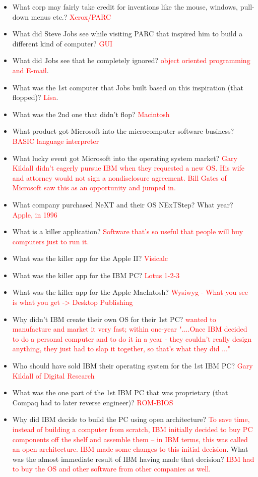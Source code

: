 \documentclass[9pt,landscape]{memoir}
\newcommand{\answer}[1]{\textcolor{red}{#1}}
\begin{document}
\begin{multicols}{6}
\begin{itemize}
    \item What corp may fairly take credit for inventions like the mouse, windows, pull-down menus etc.? \answer{Xerox/PARC}
    \item What did Steve Jobs see while visiting PARC that inspired him to build a different kind of computer? \answer{GUI}
    \item What did Jobs see that he completely ignored? \answer{object oriented programming and E-mail}.
    \item What was the 1st computer that Jobs built based on this inspiration (that flopped)? \answer{Lisa}.
    \item What was the 2nd one that didn't flop? \answer{Macintosh}
    \item What product got Microsoft into the microcomputer software business? \answer{BASIC language interpreter}
    \item What lucky event got Microsoft into the operating system market? \answer{Gary Kildall didn't eagerly pursue IBM when they requested a new OS. His wife and attorney would not sign a nondisclosure agreement. Bill Gates of Microsoft saw this as an opportunity and jumped in.}
    \item What company purchased NeXT and their OS NExTStep? What year? \answer{Apple, in 1996}
    \item What is a killer application? \answer{Software that's so useful that people will buy computers just to run it.}
    \item What was the killer app for the Apple II? \answer{Visicalc}
    \item What was the killer app for the IBM PC? \answer{Lotus 1-2-3}
    \item What was the killer app for the Apple MacIntosh? \answer{Wysiwyg - What you see is what you get -> Desktop Publishing}
    \item Why didn't IBM create their own OS for their 1st PC? \answer{wanted to manufacture and market it very fast; within one-year "....Once IBM decided to do a personal computer and to do it in a year - they couldn't really design anything, they just had to slap it together, so that's what they did ..."}
    \item Who should have sold IBM their operating system for the 1st IBM PC? \answer{Gary Kildall of Digital Research} \item What was the one part of the 1st IBM PC that was proprietary (that Compaq had to later reverse engineer)? \answer{ROM-BIOS}
    \item Why did IBM decide to build the PC using open architecture? \answer{To save time, instead of building a computer from scratch, IBM initially decided to buy PC components off the shelf and assemble them -- in IBM terms, this was called an open architecture. IBM made some changes to this initial decision}. What was the almost immediate result of IBM having made that decision? \answer{IBM had to buy the OS and other software from other companies as well.}

\end{itemize}
\end{multicols}
\end{document}
